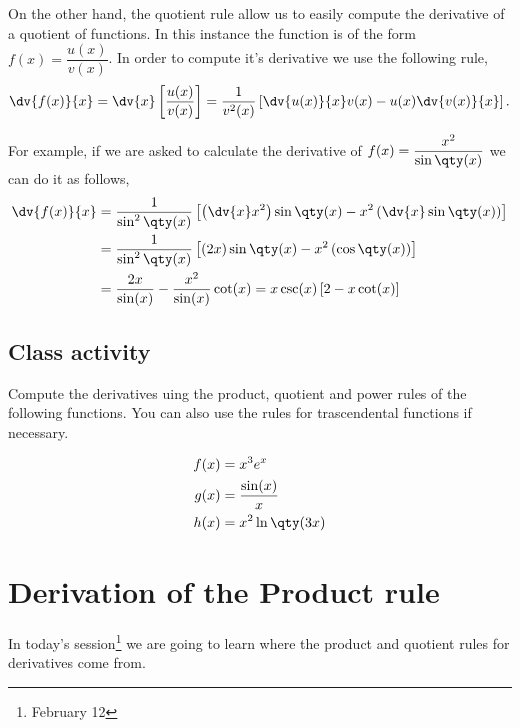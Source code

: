 \documentclass[../main-notes.tex]{subfile}
\begin{document}
On the other hand, the quotient rule allow us to easily compute the derivative of a quotient of functions.
In this instance the function is of the form \(f(x) = \dfrac{u(x)}{v(x)}\).
In order to compute it's derivative we use the following rule,
\begin{gather}
    \dv{f(x)}{x} = \dv{x}\left[\frac{u(x)}{v(x)}\right] = \frac{1}{v^{2}(x)}\left[\dv{u(x)}{x}v(x) - u(x)\dv{v(x)}{x}\right]. 
\end{gather}

For example, if we are asked to calculate the derivative of \(f(x) = \dfrac{x^{2}}{\sin\qty(x)}\) we can do it as follows,
\begin{align*}
    \dv{f(x)}{x} &= \frac{1}{\sin^{2}\qty(x)}\left[\left(\dv{x}x^{2}\right)\sin\qty(x) - x^{2}\left(\dv{x}\sin\qty(x)\right)\right] \\
                 &= \frac{1}{\sin^{2}\qty(x)}\left[\left(2x\right)\sin\qty(x) - x^{2}\left(\cos\qty(x)\right)\right] \\
                 &= \frac{2x}{\sin(x)} - \frac{x^2}{\sin(x)}\cot(x) = x\csc(x)\left[2-x\cot(x)\right]
\end{align*}

\subsection{Class activity}

Compute the derivatives uing the product, quotient and power rules of the following functions.
You can also use the rules for trascendental functions if necessary.

\begin{align*}
    f(x) &= x^{3}e^{x} \\
    g(x) &= \frac{\sin(x)}{x} \\
    h(x) &= x^{2}\ln\qty(3x)
\end{align*}


\newpage

\section{Derivation of the Product rule}

In today's session\footnote{February 12} we are going to learn where the product and quotient rules for derivatives come from.
\end{document}
